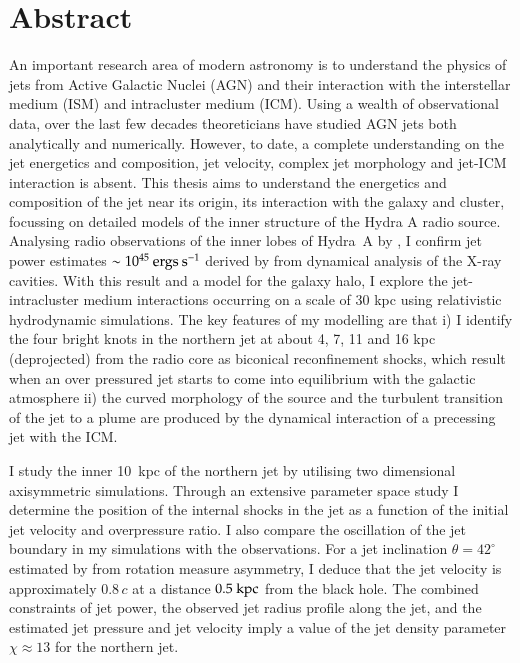 \section*{Abstract}


An important research area of modern astronomy is to understand the physics of jets from Active Galactic Nuclei (AGN) and their interaction with the interstellar medium (ISM) and intracluster medium (ICM). Using a wealth of observational data, over the last few decades theoreticians have studied AGN jets both analytically and numerically. However, to date, a complete understanding on the jet energetics and composition, jet velocity, complex jet morphology and jet-ICM interaction is absent. This thesis aims to understand the energetics and composition of the jet near its origin, its interaction with the galaxy and cluster, focussing on detailed models of the inner structure of the Hydra A radio source. Analysing radio observations  of the inner lobes of Hydra~A by \citet{taylor90}, I confirm jet power estimates $\sim 10^{45} \rm \> ergs \> s^{-1}$ derived by \citet{wise07} from dynamical analysis of the X-ray cavities. With this result and a model for the galaxy halo, I explore the jet-intracluster medium interactions occurring on a scale of 30 kpc using relativistic hydrodynamic simulations. The key features of my modelling are that i) I identify the four bright knots in the northern jet at about 4, 7, 11 and 16 kpc (deprojected) from the radio core as biconical reconfinement shocks, which result when an over pressured jet starts to come into equilibrium with the galactic atmosphere ii) the curved morphology of the source and the turbulent transition of the jet to a plume are produced by the dynamical interaction of a precessing jet with the ICM.  

I study the inner 10~kpc of the northern jet by utilising two dimensional axisymmetric simulations. Through an extensive parameter space study I determine the position of the internal shocks in the jet as a function of the initial jet velocity and overpressure ratio. I also compare the oscillation of the jet boundary in my simulations with the observations. For a jet inclination $\theta = 42^\circ$ estimated by \citet{taylor93} from rotation measure asymmetry, I deduce that the jet velocity is approximately $ 0.8 \,c$ at a distance $0.5 \ \rm kpc$ from the black hole. The combined constraints of jet power, the observed jet radius profile along the jet, and the estimated jet pressure and jet velocity imply a value of the jet density parameter $\chi \approx 13$ for the northern jet.

